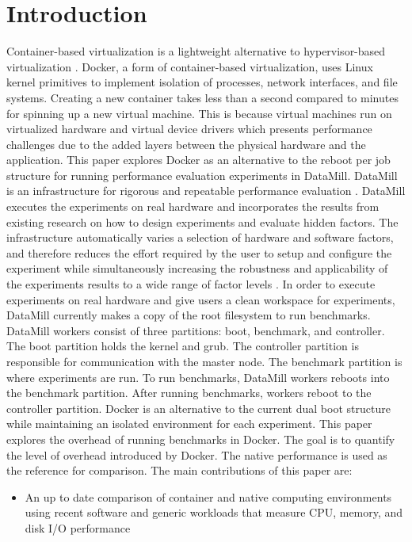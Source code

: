 \documentclass[11pt]{article}
\begin{document}
\section{Introduction}
Container-based virtualization is a lightweight alternative to hypervisor-based virtualization \cite{morabito}. Docker, a form of container-based virtualization, uses Linux kernel primitives to implement isolation of processes, network interfaces, and file systems. Creating a new container takes less than a second compared to minutes for spinning up a new virtual machine. This is because virtual machines run on virtualized hardware and virtual device drivers which presents performance challenges due to the added layers between the physical hardware and the application. This paper explores Docker as an alternative to the reboot per job structure for running performance evaluation experiments in DataMill. 
DataMill is an infrastructure for rigorous and repeatable performance evaluation \cite{augusto}. DataMill executes the experiments on real hardware and incorporates the results from existing research on how to design experiments and evaluate hidden factors. The infrastructure automatically varies a selection of hardware and software factors, and therefore reduces the effort required by the user to setup and configure the experiment while simultaneously increasing the robustness and applicability of the experiments results to a wide range of factor levels \cite{augusto}. In order to execute experiments on real hardware and give users a clean workspace for experiments, DataMill currently makes a copy of the root filesystem to run benchmarks. DataMill workers consist of three partitions: boot, benchmark, and controller. The boot partition holds the kernel and grub. The controller partition is responsible for communication with the master node. The benchmark partition is where experiments are run. To run benchmarks, DataMill workers reboots into the benchmark partition. After running benchmarks, workers reboot to the controller partition. 
Docker is an alternative to the current dual boot structure while maintaining an isolated environment for each experiment. This paper explores the overhead of running benchmarks in Docker. The goal is to quantify the level of overhead introduced by Docker. The native performance is used as the reference for comparison. The main contributions of this paper are:
\begin{itemize}
	\item An up to date comparison of container and native computing environments using recent software and generic workloads that measure CPU, memory, and disk I/O performance
\end{itemize}
\end{document}

